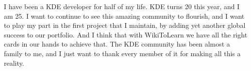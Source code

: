 I have been a KDE developer for half of my life. KDE turns 20 this year, and I am 25. I want to continue to see this amazing community to flourish, and I want to play my part in the first project that I maintain, by adding yet another global success to our portfolio. And I think that with WikiToLearn we have all the right cards in our hands to achieve that.
The KDE community has been almost a family to me, and I just want to thank every member of it for making all this a reality.
